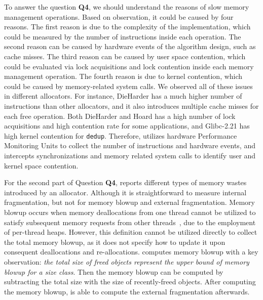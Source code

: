 To answer the question \textbf{Q4}, we should understand the reasons of slow memory management operations. Based on observation, it could be caused by four reasons. The first reason is due to the complexity of the implementation, which could be measured by the number of instructions inside each operation. The second reason can be caused by hardware events of the algorithm design, such as cache misses. The third reason can be caused by user space contention, which could be evaluated via lock acquisitions and lock contention inside each memory management operation. The fourth reason is due to kernel contention, which could be caused by memory-related system calls. 
We observed all of these issues in different allocators. For instance, DieHarder has a much higher number of instructions than other allocators, and it also introduces multiple cache misses for each free operation. Both DieHarder and Hoard has a high number of lock acquisitions and high contention rate for some applications, and Glibc-2.21 has high kernel contention for \texttt{dedup}. Therefore, \MP{} utilizes hardware Performance Monitoring Units to collect the number of instructions and hardware events, and intercepts synchronizations and memory related system calls to identify user and kernel space contention. 

For the second part of Question \textbf{Q4}, \MP{} reports different types of memory wastes introduced by an allocator. Although it is straightforward to measure internal fragmentation, but not for memory blowup and external fragmentation. Memory blowup occurs when memory deallocations from one thread cannot be utilized to satisfy subsequent memory requests from other threads~\cite{Hoard}, due to the employment of per-thread heaps. However, this definition cannot be utilized directly to collect the total memory blowup, as it does not specify how to update it upon consequent deallocations and re-allocations. \MP{} computes memory blowup with a key observation: \textit{the total size of freed objects represent the upper bound of memory blowup for a size class}. Then the memory blowup can be computed by subtracting the total size with the size of recently-freed objects. After computing the memory blowup, \MP{} is able to compute the external fragmentation afterwards. 



 
